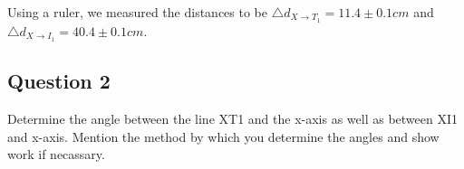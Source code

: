 \documentclass[12pt]{article}
\begin{document}
\begin{center}
\begin{figure}[H]
\centering
{}
\end{figure}
\end{center}

Using a ruler, we measured the distances to be $\triangle{d}_{X\rightarrow{}T_{1}} = 11.4\pm0.1cm$ and $\triangle{d}_{X\rightarrow{}I_{1}} = 40.4\pm0.1cm$. 

\pagebreak

\subsection{Question 2}
Determine the angle between the line XT1 and the x-axis as well as between XI1 and x-axis. Mention the method by which you determine the angles and show work if necassary.
\end{document}
